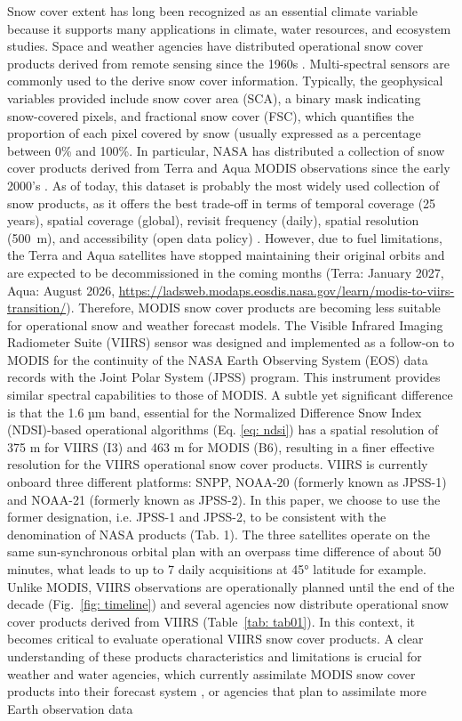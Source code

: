 \documentclass[tc, manuscript]{copernicus}
\begin{document}
Snow cover extent has long been recognized as an essential climate variable because it supports many applications in climate, water resources, and ecosystem studies. Space and weather agencies have distributed operational snow cover products derived from remote sensing since the 1960s \citep{ramsay_interactive_1998}. Multi-spectral sensors are commonly used to the derive snow cover information. Typically, the geophysical variables provided include snow cover area (SCA), a binary mask indicating snow-covered pixels, and fractional snow cover (FSC), which quantifies the proportion of each pixel covered by snow (usually expressed as a percentage between 0\% and 100\%. In particular, NASA has distributed a collection of snow cover products derived from Terra and Aqua MODIS observations since the early 2000's \citep{hall_modis_2002}. As of today, this dataset is probably the most widely used collection of snow products, as it offers the best trade-off in terms of temporal coverage (25 years), spatial coverage (global), revisit frequency (daily), spatial resolution (500~m), and accessibility (open data policy) \citep{gascoin_remote_2024}. However, due to fuel limitations, the Terra and Aqua satellites have stopped maintaining their original orbits and are expected to be decommissioned in the coming months (Terra: January 2027, Aqua: August 2026, \url{https://ladsweb.modaps.eosdis.nasa.gov/learn/modis-to-viirs-transition/}). Therefore, MODIS snow cover products are becoming less suitable for  operational snow and weather forecast models. The Visible Infrared Imaging Radiometer Suite (VIIRS) sensor was designed and implemented as a follow-on to MODIS for the continuity of the NASA Earth Observing System (EOS) data records with the Joint Polar System (JPSS) program. This instrument provides similar spectral capabilities to those of MODIS. A subtle yet significant difference is that the 1.6 µm band, essential for the Normalized Difference Snow Index (NDSI)-based operational algorithms (Eq. \ref{eq: ndsi}) has a spatial resolution of 375 m for VIIRS (I3) and 463 m for MODIS (B6), resulting in a finer effective resolution for the VIIRS operational snow cover products. VIIRS is currently onboard three different platforms: SNPP, NOAA-20 (formerly known as JPSS-1) and NOAA-21 (formerly known as JPSS-2). In this paper, we choose to use the former designation, i.e. JPSS-1 and JPSS-2, to be consistent with the denomination of NASA products (Tab. 1).  The three satellites operate on the same sun-synchronous orbital plan \citep{zhou2019OverviewSciencePerformances} with an overpass time difference of about 50 minutes, what leads to up to 7 daily acquisitions at 45° latitude for example. Unlike MODIS, VIIRS observations are operationally planned until the end of the decade (Fig.~\ref{fig: timeline}) and several agencies now distribute operational snow cover products derived from VIIRS (Table~\ref{tab: tab01}). In this context, it becomes critical to evaluate operational VIIRS snow cover products. A clear understanding of these products characteristics and limitations is crucial for weather and water agencies, which currently assimilate MODIS snow cover products into their forecast system \citep{ saloranta2016OperationalSnowMapping}, or agencies that plan to assimilate more Earth observation data 
\end{document}
